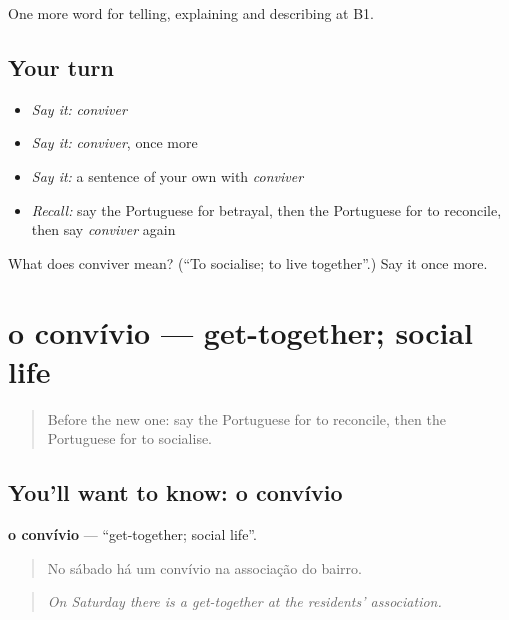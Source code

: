 \begin{grammarlens}[title={What you've built}]
One more word for telling, explaining and describing at B1.
\end{grammarlens}

\subsection*{Your turn}
\begin{itemize}
\raggedright
  \item \emph{Say it:} \emph{conviver}
  \item \emph{Say it:} \emph{conviver}, once more
  \item \emph{Say it:} a sentence of your own with \emph{conviver}
  \item \emph{Recall:} say the Portuguese for betrayal, then the Portuguese for to reconcile, then say \emph{conviver} again
\end{itemize}

\begin{tcolorbox}[breakable,colback=teal!4,colframe=teal!35!black,title={Before you move on}]
What does conviver mean? (\textquotedblleft{}To socialise; to live together\textquotedblright{}.) Say it once more.
\end{tcolorbox}
\section[o convívio]{o convívio — get-together; social life}

\label{lesson:PT-C498-convivio}



\begin{quote}
Before the new one: say the Portuguese for to reconcile, then the Portuguese for to socialise.
\end{quote}

\subsection*{You'll want to know: o convívio}
\textbf{o convívio} — \textquotedblleft{}get-together; social life\textquotedblright{}.

\begin{quote}
No sábado há um convívio na associação do bairro.
\end{quote}

\begin{quote}
\emph{On Saturday there is a get-together at the residents' association.}
\end{quote}

